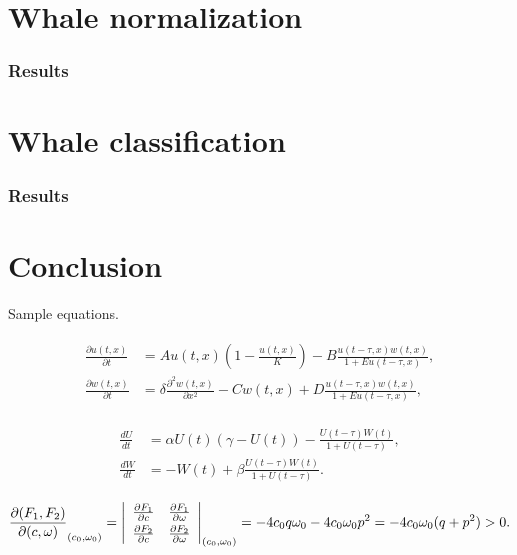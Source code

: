 \documentclass{IET}%
\begin{document}
\section{Whale normalization}

\subsubsection{Results}

\section{Whale classification}

\subsubsection{Results}

\section{Conclusion}
Sample equations.

\begin{align}\label{1.1}
\begin{split}
\frac{\partial u(t,x)}{\partial t} &= Au(t,x) \left(1-\frac{u(t,x)}{K}\right)-B\frac{u(t-\tau,x) w(t,x)}{1+Eu(t-\tau,x)},\\
\frac{\partial w(t,x)}{\partial t} &=\delta \frac{\partial^2w(t,x)}{\partial x^2}-Cw(t,x)+D\frac{u(t-\tau,x)w(t,x)}{1+Eu(t-\tau,x)},
\end{split}
\end{align}

\begin{align}\label{1.2}
\begin{split}
\frac{dU}{dt} &=\alpha U(t)(\gamma -U(t))-\frac{U(t-\tau)W(t)}{1+U(t-\tau)},\\
\frac{dW}{dt} &=-W(t)+\beta\frac{U(t-\tau)W(t)}{1+U(t-\tau)}.
\end{split}
\end{align}

\[
\frac{\partial(F_1,F_2)}{\partial(c,\omega)}_{(c_0,\omega_0)} = \left|
\begin{array}{ll}
\frac{\partial F_1}{\partial c} &\frac{\partial F_1}{\partial \omega} \\\noalign{\vskip3pt}
\frac{\partial F_2}{\partial c}&\frac{\partial F_2}{\partial \omega}
\end{array}\right|_{(c_0,\omega_0)}=-4c_0q\omega_0 -4c_0\omega_0p^2 =-4c_0\omega_0(q+p^2)>0.
\]
\end{document}
